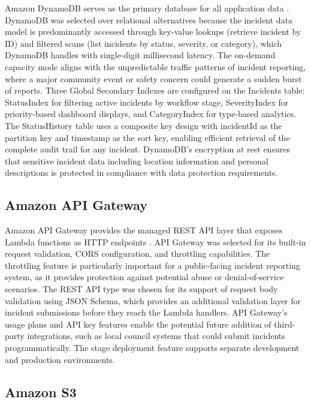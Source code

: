\documentclass[conference]{IEEEtran}
\begin{document}
Amazon DynamoDB serves as the primary database for all application data \cite{awsdynamodb}. DynamoDB was selected over relational alternatives because the incident data model is predominantly accessed through key-value lookups (retrieve incident by ID) and filtered scans (list incidents by status, severity, or category), which DynamoDB handles with single-digit millisecond latency. The on-demand capacity mode aligns with the unpredictable traffic patterns of incident reporting, where a major community event or safety concern could generate a sudden burst of reports. Three Global Secondary Indexes are configured on the Incidents table: StatusIndex for filtering active incidents by workflow stage, SeverityIndex for priority-based dashboard displays, and CategoryIndex for type-based analytics. The StatusHistory table uses a composite key design with incidentId as the partition key and timestamp as the sort key, enabling efficient retrieval of the complete audit trail for any incident. DynamoDB's encryption at rest ensures that sensitive incident data including location information and personal descriptions is protected in compliance with data protection requirements.

\subsection{Amazon API Gateway}

Amazon API Gateway provides the managed REST API layer that exposes Lambda functions as HTTP endpoints \cite{awsapigateway}. API Gateway was selected for its built-in request validation, CORS configuration, and throttling capabilities. The throttling feature is particularly important for a public-facing incident reporting system, as it provides protection against potential abuse or denial-of-service scenarios. The REST API type was chosen for its support of request body validation using JSON Schema, which provides an additional validation layer for incident submissions before they reach the Lambda handlers. API Gateway's usage plans and API key features enable the potential future addition of third-party integrations, such as local council systems that could submit incidents programmatically. The stage deployment feature supports separate development and production environments.

\subsection{Amazon S3}
\end{document}
